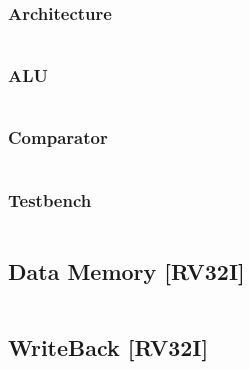 \subsubsection{Architecture}
\begin{code}
\label{code:IE_code}  
\inputminted[fontsize=\footnotesize]{vhdl}{\srcfolder instr_exec.vhd}
\end{code}

\subsubsection{ALU}
\begin{code}
\label{code:IE_ALU}  
\inputminted[fontsize=\footnotesize]{vhdl}{\srcfolder ALU.vhd}
\end{code}
\newpage


\subsubsection{Comparator}
\begin{code}
\label{code:IE_comparator}  
\inputminted[fontsize=\footnotesize]{vhdl}{\srcfolder comparator.vhd}
\end{code}
\newpage


\subsubsection{Testbench}
\begin{code}
\label{code:IE_TB}  
\inputminted[fontsize=\footnotesize]{vhdl}{\simfolder IE_testbench.vhd}
\end{code}
\newpage


\subsection{Data Memory [RV32I]}
\begin{code}
\label{code:DM_code}  
\inputminted[fontsize=\footnotesize]{vhdl}{\srcfolder data_memory.vhd}
\end{code}
\newpage


\subsection{WriteBack [RV32I]}
\begin{code}
\label{code:WB_code}  
\inputminted[fontsize=\footnotesize]{vhdl}{\srcfolder write_back.vhd}
\end{code}

